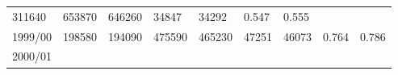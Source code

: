 \documentclass[
  spanish,
]{article}
\begin{document}
\begin{longtable}[]{@{}lllllllll@{}}
\begin{minipage}[t]{0.10\columnwidth}
311640\strut
\end{minipage} & \begin{minipage}[t]{0.09\columnwidth}\raggedright
653870\strut
\end{minipage} & \begin{minipage}[t]{0.10\columnwidth}\raggedright
646260\strut
\end{minipage} & \begin{minipage}[t]{0.08\columnwidth}\raggedright
34847\strut
\end{minipage} & \begin{minipage}[t]{0.09\columnwidth}\raggedright
34292\strut
\end{minipage} & \begin{minipage}[t]{0.08\columnwidth}\raggedright
0.547\strut
\end{minipage} & \begin{minipage}[t]{0.09\columnwidth}\raggedright
0.555\strut
\end{minipage}\tabularnewline
\begin{minipage}[t]{0.06\columnwidth}\raggedright
1999/00\strut
\end{minipage} & \begin{minipage}[t]{0.09\columnwidth}\raggedright
198580\strut
\end{minipage} & \begin{minipage}[t]{0.10\columnwidth}\raggedright
194090\strut
\end{minipage} & \begin{minipage}[t]{0.09\columnwidth}\raggedright
475590\strut
\end{minipage} & \begin{minipage}[t]{0.10\columnwidth}\raggedright
465230\strut
\end{minipage} & \begin{minipage}[t]{0.08\columnwidth}\raggedright
47251\strut
\end{minipage} & \begin{minipage}[t]{0.09\columnwidth}\raggedright
46073\strut
\end{minipage} & \begin{minipage}[t]{0.08\columnwidth}\raggedright
0.764\strut
\end{minipage} & \begin{minipage}[t]{0.09\columnwidth}\raggedright
0.786\strut
\end{minipage}\tabularnewline
\begin{minipage}[t]{0.06\columnwidth}\raggedright
2000/01\strut
\end{minipage} & \begin{minipage}[t]{0.09\columnwidth}\raggedright

\end{minipage}
\end{longtable}
\end{document}
